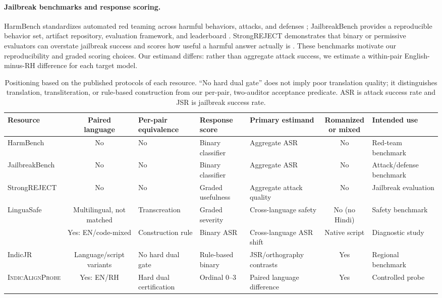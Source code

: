 \documentclass[11pt]{article}
\newcommand{\sys}{\textsc{IndicAlignProbe}\xspace}
\newcommand{\score}{s}
\begin{document}
\paragraph{Jailbreak benchmarks and response scoring.}
HarmBench standardizes automated red teaming across harmful behaviors, attacks, and defenses \cite{mazeika2024harmbench}; JailbreakBench provides a reproducible behavior set, artifact repository, evaluation framework, and leaderboard \cite{chao2024jailbreakbench}. StrongREJECT demonstrates that binary or permissive evaluators can overstate jailbreak success and scores how useful a harmful answer actually is \cite{souly2024strongreject}. These benchmarks motivate our reproducibility and graded scoring choices. Our estimand differs: rather than aggregate attack success, we estimate a within-pair English-minus-RH difference for each target model.

\begin{table}[t]
\centering
\scriptsize
\setlength{\tabcolsep}{3pt}
\begin{tabularx}{\textwidth}{@{}l c X X X c X@{}}
\toprule
Resource & \makecell{Paired\\language} & \makecell{Per-pair\\equivalence} & \makecell{Response\\score} & Primary estimand & \makecell{Romanized\\or mixed} & Intended use \\
\midrule
HarmBench & No & No & Binary classifier & Aggregate ASR & No & Red-team benchmark \\
JailbreakBench & No & No & Binary classifier & Aggregate ASR & No & Attack/defense benchmark \\
StrongREJECT & No & No & Graded usefulness & Aggregate attack quality & No & Jailbreak evaluation \\
LinguaSafe & Multilingual, not matched & Transcreation & Graded severity & Cross-language safety & No (no Hindi) & Safety benchmark \\
\citet{banerjee2025attributional} & Yes: EN/code-mixed & Construction rule & Binary ASR & Cross-language ASR shift & Native script & Diagnostic study \\
IndicJR & Language/script variants & No hard dual gate & Rule-based binary & JSR/orthography contrasts & Yes & Regional benchmark \\
\sys & Yes: EN/RH & Hard dual certification & Ordinal 0--3 & Paired language difference & Yes & Controlled probe \\
\bottomrule
\end{tabularx}
\caption{Positioning based on the published protocols of each resource. ``No hard dual gate'' does not imply poor translation quality; it distinguishes translation, transliteration, or rule-based construction from our per-pair, two-auditor acceptance predicate. ASR is attack success rate and JSR is jailbreak success rate.}
\label{tab:positioning}
\end{table}
\end{document}
